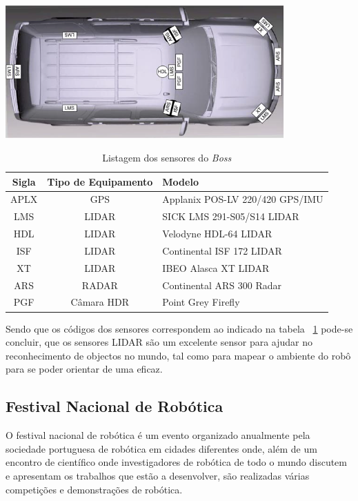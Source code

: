 \begin{center}
	\includegraphics[width=0.80\textwidth]{figures/boss_sensors.png}
	\label{fig:2}
\end{center}

\begin{table}
\begin{center}
\begin{tabular} { c c l }
	Sigla & Tipo de Equipamento & Modelo \\
	\hline
	APLX & GPS & Applanix POS-LV 220/420 GPS/IMU \\
	LMS & LIDAR & SICK LMS 291-S05/S14 LIDAR \\
	HDL & LIDAR & Velodyne HDL-64 LIDAR \\
	ISF & LIDAR & Continental ISF 172 LIDAR \\
	XT & LIDAR & IBEO Alasca XT LIDAR \\
	ARS & RADAR & Continental ARS 300 Radar \\
	PGF & Câmara HDR & Point Grey Firefly \\
	\hline
\end{tabular}
	\caption{Listagem dos sensores do \emph{Boss}}
	\label{boss_sensor}
\end{center}
\end{table}

Sendo que os códigos dos sensores correspondem ao indicado na tabela ~\ref{boss_sensor}
pode-se concluir, que os sensores LIDAR são um excelente sensor para ajudar no reconhecimento
de objectos no mundo, tal como para mapear o ambiente do robô para se poder orientar de uma eficaz.


\subsection{Festival Nacional de Robótica}

O festival nacional de robótica é um evento organizado anualmente pela sociedade
portuguesa de robótica em cidades diferentes onde, além de um encontro de científico
onde investigadores de robótica de todo o mundo discutem e apresentam os trabalhos
que estão a desenvolver, são realizadas várias competições e demonstrações de robótica.

